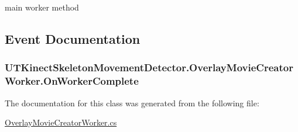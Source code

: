 main worker method 



\subsection{Event Documentation}
\hypertarget{class_u_t_kinect_skeleton_movement_detector_1_1_overlay_movie_creator_worker_a8287ec8e540ee2d64881ae833d70df20}{
\subsubsection[{On\-Worker\-Complete}]{ U\-T\-Kinect\-Skeleton\-Movement\-Detector.\-Overlay\-Movie\-Creator\-Worker.\-On\-Worker\-Complete}}\label{class_u_t_kinect_skeleton_movement_detector_1_1_overlay_movie_creator_worker_a8287ec8e540ee2d64881ae833d70df20}


The documentation for this class was generated from the following file\-:\begin{DoxyCompactItemize}
\item 
\hyperlink{_overlay_movie_creator_worker_8cs}{Overlay\-Movie\-Creator\-Worker.\-cs}\end{DoxyCompactItemize}
